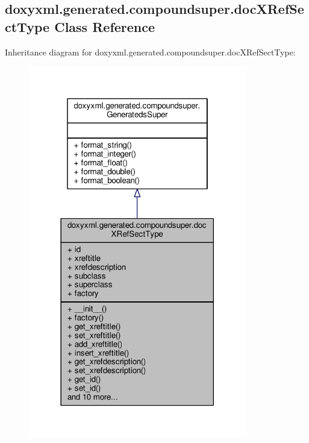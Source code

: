 \subsection{doxyxml.\+generated.\+compoundsuper.\+doc\+X\+Ref\+Sect\+Type Class Reference}
\label{classdoxyxml_1_1generated_1_1compoundsuper_1_1docXRefSectType}


Inheritance diagram for doxyxml.\+generated.\+compoundsuper.\+doc\+X\+Ref\+Sect\+Type\+:
\nopagebreak
\begin{figure}[H]
\begin{center}
\leavevmode
\includegraphics[width=270pt]{dd/d52/classdoxyxml_1_1generated_1_1compoundsuper_1_1docXRefSectType__inherit__graph}
\end{center}
\end{figure}


